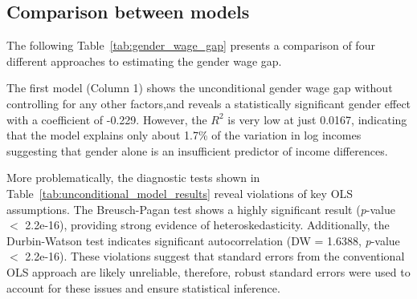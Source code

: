 \documentclass[a4paper,12pt]{article}
\begin{document}
\subsection{Comparison between models}
The following Table~\ref{tab:gender_wage_gap} presents a comparison of four different approaches to estimating the gender wage gap.

\begin{table}[H]
\centering
\caption{Comparison of Unconditional and Conditional Gender Wage Gaps}
\label{tab:gender_wage_gap}
%
\end{table}
The first model (Column 1) shows the unconditional gender wage gap without controlling for any other factors,and reveals a statistically significant gender effect with a coefficient of -0.229. However, the $R^2$ is very low at just 0.0167, indicating that the model explains only about 1.7\% of the variation in log incomes suggesting that gender alone is an insufficient predictor of income differences.

More problematically, the diagnostic tests shown in Table~\ref{tab:unconditional_model_results} reveal violations of key OLS assumptions. The Breusch-Pagan test shows a highly significant result (\textit{p}-value $<$ 2.2e-16), providing strong evidence of heteroskedasticity. Additionally, the Durbin-Watson test indicates significant autocorrelation (DW = 1.6388, \textit{p}-value $<$ 2.2e-16). These violations suggest that standard errors from the conventional OLS approach are likely unreliable, therefore, robust standard errors were used to account for these issues and ensure statistical inference.
\end{document}
